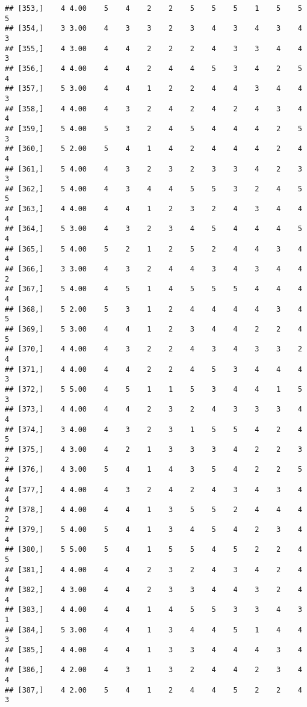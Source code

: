 \documentclass[]{article}
\begin{document}
\begin{verbatim}
## [353,]    4 4.00    5    4    2    2    5    5    5    1    5    5    5
## [354,]    3 3.00    4    3    3    2    3    4    3    4    3    4    3
## [355,]    4 3.00    4    4    2    2    2    4    3    3    4    4    3
## [356,]    4 4.00    4    4    2    4    4    5    3    4    2    5    4
## [357,]    5 3.00    4    4    1    2    2    4    4    3    4    4    3
## [358,]    4 4.00    4    3    2    4    2    4    2    4    3    4    4
## [359,]    5 4.00    5    3    2    4    5    4    4    4    2    5    3
## [360,]    5 2.00    5    4    1    4    2    4    4    4    2    4    4
## [361,]    5 4.00    4    3    2    3    2    3    3    4    2    3    3
## [362,]    5 4.00    4    3    4    4    5    5    3    2    4    5    5
## [363,]    4 4.00    4    4    1    2    3    2    4    3    4    4    4
## [364,]    5 3.00    4    3    2    3    4    5    4    4    4    5    4
## [365,]    5 4.00    5    2    1    2    5    2    4    4    3    4    4
## [366,]    3 3.00    4    3    2    4    4    3    4    3    4    4    2
## [367,]    5 4.00    4    5    1    4    5    5    5    4    4    4    4
## [368,]    5 2.00    5    3    1    2    4    4    4    4    3    4    5
## [369,]    5 3.00    4    4    1    2    3    4    4    2    2    4    5
## [370,]    4 4.00    4    3    2    2    4    3    4    3    3    2    4
## [371,]    4 4.00    4    4    2    2    4    5    3    4    4    4    3
## [372,]    5 5.00    4    5    1    1    5    3    4    4    1    5    3
## [373,]    4 4.00    4    4    2    3    2    4    3    3    3    4    4
## [374,]    3 4.00    4    3    2    3    1    5    5    4    2    4    5
## [375,]    4 3.00    4    2    1    3    3    3    4    2    2    3    2
## [376,]    4 3.00    5    4    1    4    3    5    4    2    2    5    4
## [377,]    4 4.00    4    3    2    4    2    4    3    4    3    4    4
## [378,]    4 4.00    4    4    1    3    5    5    2    4    4    4    2
## [379,]    5 4.00    5    4    1    3    4    5    4    2    3    4    4
## [380,]    5 5.00    5    4    1    5    5    4    5    2    2    4    5
## [381,]    4 4.00    4    4    2    3    2    4    3    4    2    4    4
## [382,]    4 3.00    4    4    2    3    3    4    4    3    2    4    4
## [383,]    4 4.00    4    4    1    4    5    5    3    3    4    3    1
## [384,]    5 3.00    4    4    1    3    4    4    5    1    4    4    3
## [385,]    4 4.00    4    4    1    3    3    4    4    4    3    4    4
## [386,]    4 2.00    4    3    1    3    2    4    4    2    3    4    4
## [387,]    4 2.00    5    4    1    2    4    4    5    2    2    4    3

\end{verbatim}
\end{document}
